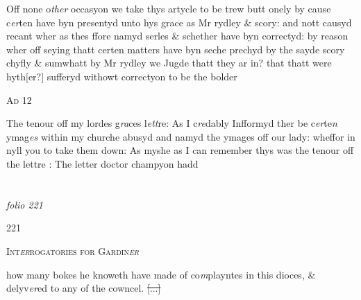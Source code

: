 \documentclass[12pt, a4paper]{book}
\begin{document}
		\ifthenelse{\isodd{\thepage}}
		{\reversemarginpar}
		{\normalmarginpar}
		Off none o\textit{ther} occasyon we take thys artycle to be trew butt onely by cause c\textit{er}ten have
	byn presentyd unto hys grace as Mr rydley \& scory: and nott causyd recant
wher as thes ffore namyd serles \& schether have byn correctyd: by reason
wher off seying thatt certen matters have byn seche prechyd by the sayde scory
chyfly \& sumwhatt by Mr rydley we Jugde thatt they ar in? that thatt were hyth[er?]
sufferyd withowt correctyon to be the bolder

				\begin{center} \begin{large} {\scshape Ad 12 } \end{large} \end{center}
			

		\ifthenelse{\isodd{\thepage}}
		{\reversemarginpar}
		{\normalmarginpar}
		The tenour off my lordes g\textit{ra}ces l\textit{ett}re: As I c\textit{re}dably Infformyd ther be 
c\textit{er}te\textit{n} ymag\textit{es} within my churche abusyd and namyd the ymages off
our lady: wheffor in nyll you to take them down: As myshe as I 
can remember thys was the tenour off the lettre : The letter doctor 
champyon hadd


               
\dotfill
						\newpage {} \section*{}  \subsection*{}

\textit{folio 221}



\begin{flushright}{\color{Mahogany}221}\end{flushright}

				\begin{center} \begin{large} {\scshape Int\textit{er}rogatories for Gardin\textit{er}} \end{large} \end{center}
			

		\ifthenelse{\isodd{\thepage}}
		{\reversemarginpar}
		{\normalmarginpar}
		how many bokes he knoweth have made of co\textit{m}playntes
in this dioces, \& delyv\textit{er}ed to any of the cowncel.
\sout{
				[...]
			}
\end{document}
